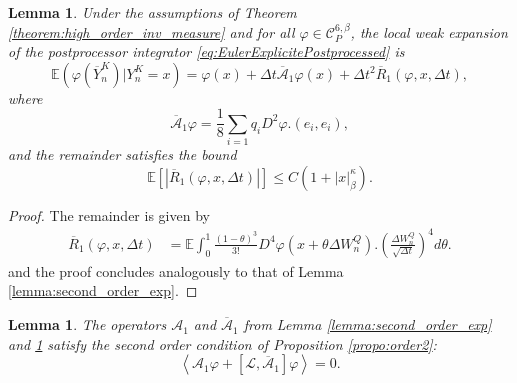 \documentclass[11pt]{amsart}
\newcommand{\E}{\mathbb{E}}
\newcommand{\IE}{\mathbb{E}}
\newtheorem{lemma}[theo]{Lemma}
\begin{document}
\begin{lemma}
\label{lemma:second_order_exp_pp}
Under the assumptions of Theorem \ref{theorem:high_order_inv_measure} and for all $\varphi\in \mathcal{C}^{6,\beta}_P$, the local weak expansion of the postprocessor integrator \eqref{eq:EulerExplicitePostprocessed} is
$$
\IE(\varphi(\overline{Y}_{n}^K)|Y_{n}^K=x)= \varphi(x) + \Delta t\overline{\mathcal{A}}_1 \varphi(x) + \Delta t^2 \overline{R}_{1}(\varphi,x,\Delta t),$$
where
$$
\overline{\mathcal{A}}_{1}\varphi = \frac18 \sum_{i=1} q_iD^2\varphi.(e_i,e_i),
$$
and the remainder satisfies the bound
$$\E[|\overline{R}_{1}(\varphi,x,\Delta t)|]\leq C (1+|x|_\beta^\kappa).$$
\end{lemma}

\begin{proof}
The remainder is given by
$$
\begin{aligned}
\overline{R}_{1}(\varphi,x,\Delta t) &=
\IE
\int_0^1 \frac{(1-\theta)^3}{3!} 
D^4\varphi(x+\theta\Delta W_n^Q).
(\frac{\Delta W_n^Q}{\sqrt{\Delta t}})^4 d\theta.
\end{aligned}$$
and the proof concludes analogously to that of Lemma \ref{lemma:second_order_exp}.
\end{proof}




\begin{lemma}
The operators $\mathcal{A}_1$ and $\overline{\mathcal{A}}_{1}$ from Lemma \ref{lemma:second_order_exp} and \ref{lemma:second_order_exp_pp} satisfy the second order condition of Proposition \ref{propo:order2}:
$$
\left\langle\mathcal{A}_{1}\varphi + [\mathcal L, \overline{\mathcal{A}}_{1}] \varphi \right\rangle =0.
$$
\end{lemma}
\end{document}
